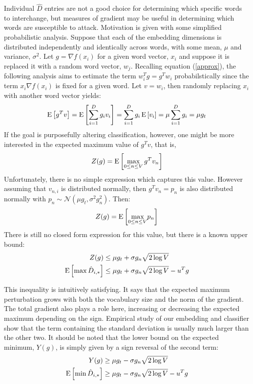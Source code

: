 Individual $\hat{D}$ entries are not a good choice for determining which specific words to interchange, but measures of gradient may be useful in determining which words are susceptible to attack.  Motivation is given with some simplified probabilistic analysis.  Suppose that each of the embedding dimensions is distributed independently and identically across words, with some mean, $\mu$ and variance, $\sigma^2$.  Let $g = \nabla f(x_i)$ for a given word vector, $x_i$ and suppose it is replaced it with a random word vector, $w_j$.  Recalling equation (\ref{approx}), the following analysis aims to estimate the term $w_i^Tg = g^Tw_i$ probabilstically since the term $x_i\nabla f(x_i)$ is fixed for a given word.  Let $v=w_i$, then randomly replacing $x_i$ with another word vector yields:
\begin{equation}
\E{g^Tv} = \E{\sum_{i=1}^D{g_iv_i}} = \sum_{i=1}^D{g_i\E{v_i}} = \mu\sum_{i=1}^D{g_i} = \mu g_t
\end{equation}
\noindent
If the goal is purposefully altering classification, however, one might be more interested in the expected maximum value of $g^Tv$, that is,
\begin{equation}
Z(g) = \E{\underset{0\leq n\leq V}{\max}\,{g^Tv_n}}
\end{equation}
\noindent
Unfortunately, there is no simple expression which captures this value.  However  assuming that $v_{n,i}$ is distributed normally, then $g^Tv_n = p_n$ is also distributed normally with
$p_n \sim \mathcal{N}(\mu g_t,\sigma^2 g_n^2)$.  Then:
\begin{align}
Z(g) = \E{\underset{0\leq n\leq V}{\max} p_n}
\end{align}
There is still no closed form expression for this value, but there is a known \cite{pm07} upper bound:
\begin{align}
Z(g) &\leq \mu g_t + \sigma g_n\sqrt{2\log{V}}\\
\E{\max \hat{D}_{i,*}} &\leq \mu g_t + \sigma g_n\sqrt{2\log{V}} -u^Tg
\end{align}

\noindent
This inequality is intuitively satisfying.  It says that the expected maximum perturbation grows with both the vocabulary size and the norm of the gradient.  The total gradient also plays a role here, increasing or decreasing the expected maximum depending on the sign.  Empirical study of our embedding and classifier show that the term containing the standard deviation is usually much larger than the other two.  It should be noted that the lower bound on the expected minimum, $Y(g)$, is simply given by a sign reversal of the second term:
\begin{align}
Y(g) &\geq \mu g_t - \sigma g_n\sqrt{2\log{V}} \\
\E{\min \hat{D}_{i,*}} &\geq \mu g_t - \sigma g_n\sqrt{2\log{V}} - u^Tg
\end{align}

